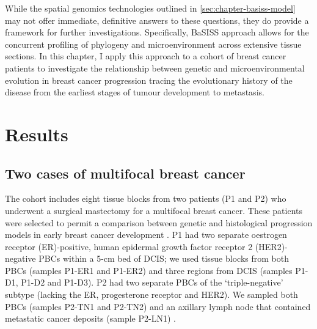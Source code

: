 While the spatial genomics technologies outlined in \cref{sec:chapter-basiss-model} may not offer immediate, definitive answers to these questions, they do provide a framework for further investigations. Specifically, \ac{BaSISS} approach allows for the concurrent profiling of phylogeny and microenvironment across extensive tissue sections. In this chapter, I apply this approach to a cohort of breast cancer patients to investigate the relationship between genetic and microenvironmental evolution in breast cancer progression tracing the evolutionary history of the disease from the earliest stages of tumour development to metastasis.

\section{Results}
\subsection{Two cases of multifocal breast cancer}

The cohort includes eight tissue blocks from two patients (P1 and P2) who underwent a surgical mastectomy for a multifocal breast cancer. These patients were selected to permit a comparison between genetic and histological progression models in early breast cancer development \parencite{Cowell2013-du} . P1 had two separate oestrogen receptor (ER)-positive, human epidermal growth factor receptor 2 (HER2)-negative \acfp{PBC} within a 5-cm bed of \ac{DCIS}; we used tissue blocks from both \acp{PBC} (samples P1-ER1 and P1-ER2) and three regions from \ac{DCIS} (samples P1-D1, P1-D2 and P1-D3). P2 had two separate PBCs of the `triple-negative' subtype (lacking the ER, progesterone receptor and HER2). We sampled both PBCs (samples P2-TN1 and P2-TN2) and an axillary lymph node that contained metastatic cancer deposits (sample P2-LN1) .


